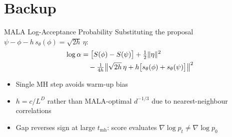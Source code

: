 \documentclass[10pt,UTF8]{beamer}
\begin{document}
\appendix
\section{Backup}

\begin{frame}{MALA Log-Acceptance Probability}
Substituting the proposal $\psi - \phi - h\,s_\theta(\phi) = \sqrt{2h}\,\eta$:
\begin{align}
    \log\alpha &= \bigl[S(\phi)-S(\psi)\bigr] + \tfrac{1}{2}\|\eta\|^2 \notag\\
    &\quad - \tfrac{1}{4h}\bigl\|\sqrt{2h}\,\eta + h\bigl[s_\theta(\phi)+s_\theta(\psi)\bigr]\bigr\|^2
\end{align}
\begin{itemize}
    \item Single MH step avoids warm-up bias
    \item $h = c/L^D$ rather than MALA-optimal $d^{-1/3}$ due to nearest-neighbour correlations
    \item Gap reverses sign at large $t_\text{mh}$: score evaluates $\nabla\log p_t \neq \nabla\log p_0$
\end{itemize}
\end{frame}
\end{document}
